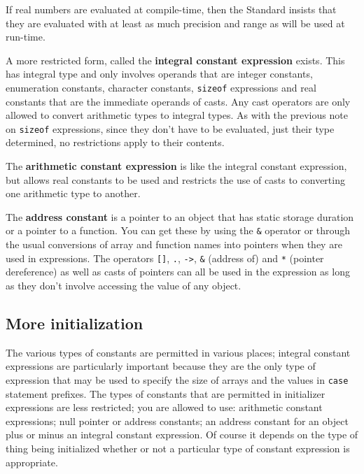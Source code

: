    If real numbers are evaluated at compile-time, then the Standard insists
    that they are evaluated with at least as much precision and range as will
    be used at run-time.


   A more restricted form, called the \textbf{integral constant
    expression} exists. This has integral type and only involves operands
    that are integer constants, enumeration constants, character constants,
    \texttt{sizeof} expressions and real constants that are the immediate
    operands of casts. Any cast operators are only allowed to convert
    arithmetic types to integral types. As with the previous note on
    \texttt{sizeof} expressions, since they don't have to be evaluated,
    just their type determined, no restrictions apply to their contents.


   The \textbf{arithmetic constant expression} is like the integral
    constant expression, but allows real constants to be used and restricts the
    use of casts to converting one arithmetic type to another.


   The \textbf{address constant} is a pointer to an object that has static
    storage duration or a pointer to a function. You can get these by using the
    \texttt{\&} operator or through the usual conversions of array and
    function names into pointers when they are used in expressions. The
    operators \texttt{[]}, \texttt{.}, \texttt{->},
    \texttt{\&} (address of) and \texttt{*} (pointer dereference) as
    well as casts of pointers can all be used in the expression as long as they
    don't involve accessing the value of any object.


  

  \subsection{More initialization}
   

   The various types of constants are permitted in various places; integral
    constant expressions are particularly important because they are the only
    type of expression that may be used to specify the size of arrays and the
    values in \texttt{case} statement prefixes. The types of constants that
    are permitted in initializer expressions are less restricted; you are
    allowed to use: arithmetic constant expressions; null pointer or address
    constants; an address constant for an object plus or minus an integral
    constant expression. Of course it depends on the type of thing being
    initialized whether or not a particular type of constant expression is
    appropriate.


